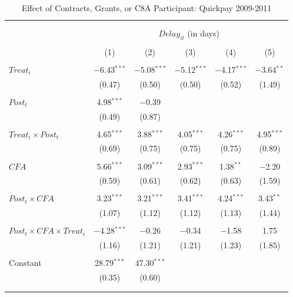 \documentclass[
]{article}
\begin{document}
\begin{table}[H] \centering 
  \caption{Effect of Contracts, Grants, or C8A Participant: Quickpay 2009-2011} 
  \label{} 
\small 
\begin{tabular}{@{\extracolsep{-2pt}}lccccc} 
\\[-1.8ex]\hline 
\hline \\[-1.8ex] 
\\[-1.8ex] & \multicolumn{5}{c}{$Delay_{it}$ (in days)} \\ 
\\[-1.8ex] & (1) & (2) & (3) & (4) & (5)\\ 
\hline \\[-1.8ex] 
 $Treat_i$ & $-$6.43$^{***}$ & $-$5.08$^{***}$ & $-$5.12$^{***}$ & $-$4.17$^{***}$ & $-$3.64$^{**}$ \\ 
  & (0.47) & (0.50) & (0.50) & (0.52) & (1.49) \\ 
  & & & & & \\ 
 $Post_t$ & 4.98$^{***}$ & $-$0.39 &  &  &  \\ 
  & (0.49) & (0.87) &  &  &  \\ 
  & & & & & \\ 
 $Treat_i \times Post_t$ & 4.65$^{***}$ & 3.88$^{***}$ & 4.05$^{***}$ & 4.26$^{***}$ & 4.95$^{***}$ \\ 
  & (0.69) & (0.75) & (0.75) & (0.75) & (0.89) \\ 
  & & & & & \\ 
 $CFA$ & 5.66$^{***}$ & 3.09$^{***}$ & 2.93$^{***}$ & 1.38$^{**}$ & $-$2.20 \\ 
  & (0.59) & (0.61) & (0.62) & (0.63) & (1.59) \\ 
  & & & & & \\ 
 $Post_t \times CFA$ & 3.23$^{***}$ & 3.21$^{***}$ & 3.41$^{***}$ & 4.24$^{***}$ & 3.43$^{**}$ \\ 
  & (1.07) & (1.12) & (1.12) & (1.13) & (1.44) \\ 
  & & & & & \\ 
 $Post_t \times CFA \times Treat_i$ & $-$4.28$^{***}$ & $-$0.26 & $-$0.34 & $-$1.58 & 1.75 \\ 
  & (1.16) & (1.21) & (1.21) & (1.23) & (1.85) \\ 
  & & & & & \\ 
 Constant & 28.79$^{***}$ & 47.30$^{***}$ &  &  &  \\ 
  & (0.35) & (0.60) &  &  &  \\ 
  & & & & & \\ 
\hline \\[-1.8ex] 

\end{tabular}
\end{table}
\end{document}
